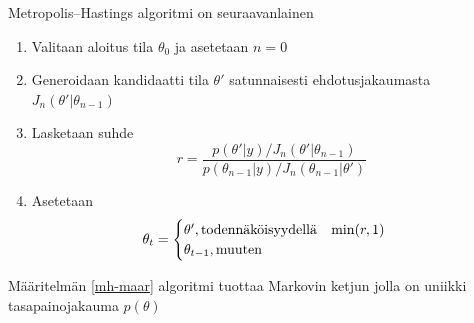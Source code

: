 \begin{maar}\label{mh-maar}
	Metropolis--Hastings algoritmi on seuraavanlainen
	\begin{enumerate}
		\item Valitaan aloitus tila $\theta_0$ ja asetetaan $n=0$
		\item Generoidaan kandidaatti tila $\theta'$ satunnaisesti ehdotusjakaumasta $J_n(\theta'|\theta_{n-1})$
		\item Lasketaan suhde
		\begin{displaymath}
			r = \frac{p(\theta'|y)/J_n(\theta'|\theta_{n-1})}{p(\theta_{n-1}|y)/J_n(\theta_{n-1}|\theta')}
		\end{displaymath}
		\item Asetetaan
		\begin{displaymath}
			\theta_t= 
			\begin{cases}
				\theta', \text{todennäköisyydellä} \hspace{0.3cm} \min(r,1) \\
				\theta_{t-1}, \text{muuten}
			\end{cases}
		\end{displaymath}
	\end{enumerate}
\end{maar}

\begin{lause}
	Määritelmän \ref{mh-maar} algoritmi tuottaa Markovin ketjun jolla on uniikki tasapainojakauma $p(\theta)$ 
\end{lause}


